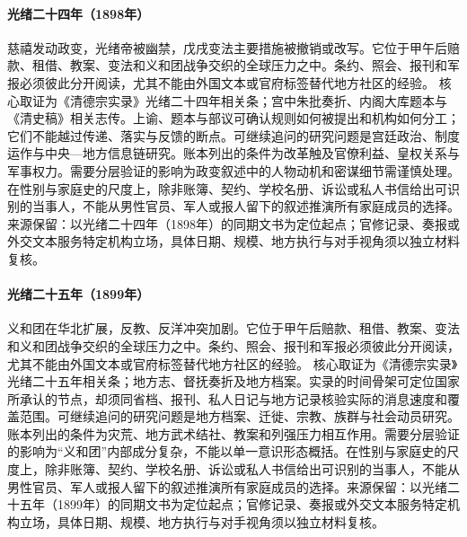 \hypertarget{public:EQ-1898-WUXU-COUP}{}\paragraph{光绪二十四年（1898年）}慈禧发动政变，光绪帝被幽禁，戊戌变法主要措施被撤销或改写。它位于甲午后赔款、租借、教案、变法和义和团战争交织的全球压力之中。条约、照会、报刊和军报必须彼此分开阅读，尤其不能由外国文本或官府标签替代地方社区的经验。 核心取证为《清德宗实录》光绪二十四年相关条；宫中朱批奏折、内阁大库题本与《清史稿》相关志传。上谕、题本与部议可确认规则如何被提出和机构如何分工；它们不能越过传递、落实与反馈的断点。可继续追问的研究问题是宫廷政治、制度运作与中央—地方信息链研究。账本列出的条件为改革触及官僚利益、皇权关系与军事权力。需要分层验证的影响为政变叙述中的人物动机和密谋细节需谨慎处理。在性别与家庭史的尺度上，除非账簿、契约、学校名册、诉讼或私人书信给出可识别的当事人，不能从男性官员、军人或报人留下的叙述推演所有家庭成员的选择。来源保留：以光绪二十四年（1898年）的同期文书为定位起点；官修记录、奏报或外交文本服务特定机构立场，具体日期、规模、地方执行与对手视角须以独立材料复核。
\hypertarget{public:EQ-1899-BOXER-UPRISING}{}\paragraph{光绪二十五年（1899年）}义和团在华北扩展，反教、反洋冲突加剧。它位于甲午后赔款、租借、教案、变法和义和团战争交织的全球压力之中。条约、照会、报刊和军报必须彼此分开阅读，尤其不能由外国文本或官府标签替代地方社区的经验。 核心取证为《清德宗实录》光绪二十五年相关条；地方志、督抚奏折及地方档案。实录的时间骨架可定位国家所承认的节点，却须同省档、报刊、私人日记与地方记录核验实际的消息速度和覆盖范围。可继续追问的研究问题是地方档案、迁徙、宗教、族群与社会动员研究。账本列出的条件为灾荒、地方武术结社、教案和列强压力相互作用。需要分层验证的影响为“义和团”内部成分复杂，不能以单一意识形态概括。在性别与家庭史的尺度上，除非账簿、契约、学校名册、诉讼或私人书信给出可识别的当事人，不能从男性官员、军人或报人留下的叙述推演所有家庭成员的选择。来源保留：以光绪二十五年（1899年）的同期文书为定位起点；官修记录、奏报或外交文本服务特定机构立场，具体日期、规模、地方执行与对手视角须以独立材料复核。
